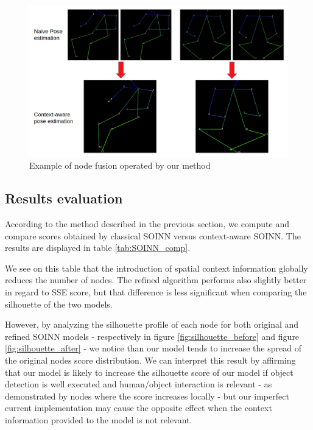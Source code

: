 \begin{figure}[htp]
    \centering
    \includegraphics[width=150mm, keepaspectratio]{images/nodes_fusion.png}
    \caption{Example of node fusion operated by our method}
    \label{fig:nodes_fusion}
\end{figure}

\pagebreak
\subsection{Results evaluation}
According to the method described in the previous section, we compute and compare scores obtained by classical SOINN versus context-aware SOINN. The results are displayed in table \ref{tab:SOINN_comp}.

We see on this table that the introduction of spatial context information globally reduces the number of nodes. The refined algorithm performs also slightly better in regard to SSE score, but that difference is less significant when comparing the silhouette of the two models.

However, by analyzing the silhouette profile of each node for both original and refined SOINN models - respectively in figure \ref{fig:silhouette_before} and figure \ref{fig:silhouette_after} - we notice than our model tends to increase the spread of the original nodes score distribution. We can interpret this result by affirming that our model is likely to increase the silhouette score of our model if object detection is well executed and human/object interaction is relevant - as demonstrated by nodes where the score increases locally - but our imperfect current implementation may cause the opposite effect when the context information provided to the model is not relevant.

